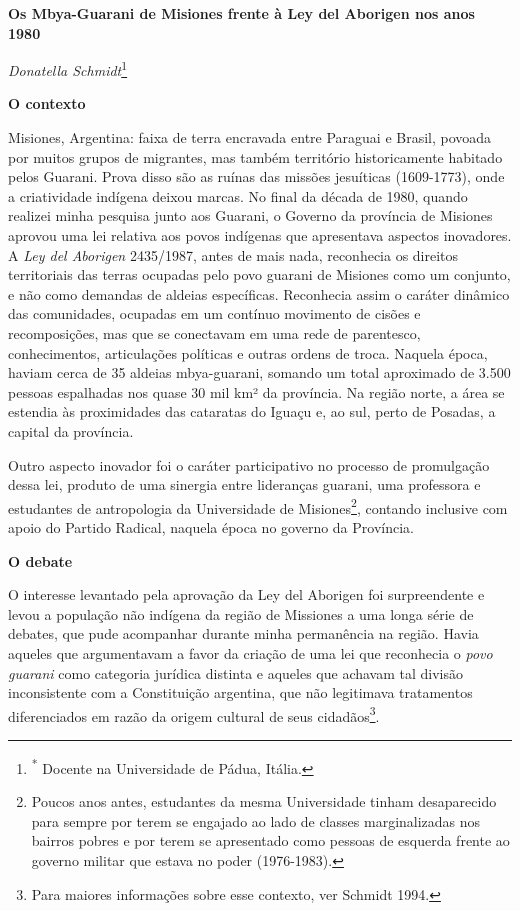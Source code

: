 \textbf{Os Mbya-Guarani de Misiones frente à Ley del Aborigen nos anos
1980}

\emph{Donatella Schmidt}\footnote{\textsuperscript{*} Docente na
  Universidade de Pádua, Itália.}

\textbf{O contexto}

Misiones, Argentina: faixa de terra encravada entre Paraguai e Brasil,
povoada por muitos grupos de migrantes, mas também território
historicamente habitado pelos Guarani. Prova disso são as ruínas das
missões jesuíticas (1609-1773), onde a criatividade indígena deixou
marcas. No final da década de 1980, quando realizei minha pesquisa junto
aos Guarani, o Governo da província de Misiones aprovou uma lei relativa
aos povos indígenas que apresentava aspectos inovadores. A \emph{Ley del
Aborigen} 2435/1987, antes de mais nada, reconhecia os direitos
territoriais das terras ocupadas pelo povo guarani de Misiones como um
conjunto, e não como demandas de aldeias específicas. Reconhecia assim o
caráter dinâmico das comunidades, ocupadas em um contínuo movimento de
cisões e recomposições, mas que se conectavam em uma rede de parentesco,
conhecimentos, articulações políticas e outras ordens de troca. Naquela
época, haviam cerca de 35 aldeias mbya-guarani, somando um total
aproximado de 3.500 pessoas espalhadas nos quase 30 mil km² da
província. Na região norte, a área se estendia às proximidades das
cataratas do Iguaçu e, ao sul, perto de Posadas, a capital da província.

Outro aspecto inovador foi o caráter participativo no processo de
promulgação dessa lei, produto de uma sinergia entre lideranças guarani,
uma professora e estudantes de antropologia da Universidade de
Misiones\footnote{Poucos anos antes, estudantes da mesma Universidade
  tinham desaparecido para sempre por terem se engajado ao lado de
  classes marginalizadas nos bairros pobres e por terem se apresentado
  como pessoas de esquerda frente ao governo militar que estava no poder
  (1976-1983).}, contando inclusive com apoio do Partido Radical,
naquela época no governo da Província.

\textbf{O debate}

O interesse levantado pela aprovação da Ley del Aborigen foi
surpreendente e levou a população não indígena da região de Missiones a
uma longa série de debates, que pude acompanhar durante minha
permanência na região. Havia aqueles que argumentavam a favor da criação
de uma lei que reconhecia o \emph{povo guarani} como categoria jurídica
distinta e aqueles que achavam tal divisão inconsistente com a
Constituição argentina, que não legitimava tratamentos diferenciados em
razão da origem cultural de seus cidadãos\footnote{Para maiores
  informações sobre esse contexto, ver Schmidt 1994.}.


